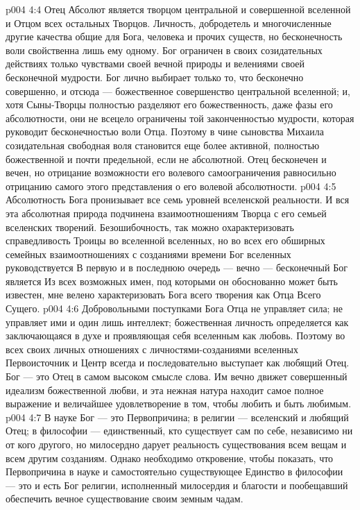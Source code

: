 \vs p004 4:4 Отец Абсолют является творцом центральной и совершенной вселенной и Отцом всех остальных Творцов. Личность, добродетель и многочисленные другие качества общие для Бога, человека и прочих существ, но бесконечность воли свойственна лишь ему одному. Бог ограничен в своих созидательных действиях только чувствами своей вечной природы и велениями своей бесконечной мудрости. Бог лично выбирает только то, что бесконечно совершенно, и отсюда --- божественное совершенство центральной вселенной; и, хотя Сыны\hyp{}Творцы полностью разделяют его божественность, даже фазы его абсолютности, они не всецело ограничены той законченностью мудрости, которая руководит бесконечностью воли Отца. Поэтому в чине сыновства Михаила созидательная свободная воля становится еще более активной, полностью божественной и почти предельной, если не абсолютной. Отец бесконечен и вечен, но отрицание возможности его волевого самоограничения равносильно отрицанию самого этого представления о его волевой абсолютности.
\vs p004 4:5 \pc Абсолютность Бога пронизывает все семь уровней вселенской реальности. И вся эта абсолютная природа подчинена взаимоотношениям Творца с его семьей вселенских творений. Безошибочность, так можно охарактеризовать справедливость Троицы во вселенной вселенных, но во всех его обширных семейных взаимоотношениях с созданиями времени Бог вселенных руководствуется  В первую и в последнюю очередь --- вечно --- бесконечный Бог является  Из всех возможных имен, под которыми он обоснованно может быть известен, мне велено характеризовать Бога всего творения как Отца Всего Сущего.
\vs p004 4:6 Добровольными поступками Бога Отца не управляет сила; не управляет ими и один лишь интеллект; божественная личность определяется как заключающаяся в духе и проявляющая себя вселенным как любовь. Поэтому во всех своих личных отношениях с личностями\hyp{}созданиями вселенных Первоисточник и Центр всегда и последовательно выступает как любящий Отец. Бог --- это Отец в самом высоком смысле слова. Им вечно движет совершенный идеализм божественной любви, и эта нежная натура находит самое полное выражение и величайшее удовлетворение в том, чтобы любить и быть любимым.
\vs p004 4:7 \pc В науке Бог --- это Первопричина; в религии --- вселенский и любящий Отец; в философии --- единственный, кто существует сам по себе, независимо ни от кого другого, но милосердно дарует реальность существования всем вещам и всем другим созданиям. Однако необходимо откровение, чтобы показать, что Первопричина в науке и самостоятельно существующее Единство в философии --- это и есть Бог религии, исполненный милосердия и благости и пообещавший обеспечить вечное существование своим земным чадам.

